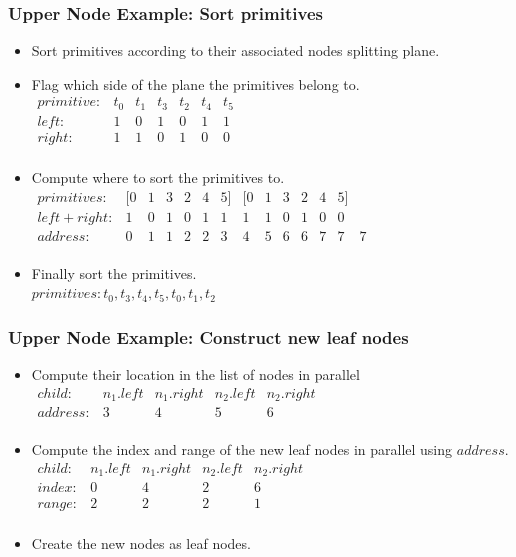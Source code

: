 \documentclass{beamer}
\begin{document}
\begin{frame}
  \frametitle{Upper Node Example: Sort primitives}
  
  \begin{itemize}
  \item Sort primitives according to their associated nodes splitting plane.
  \item Flag which side of the plane the primitives belong to.\\
    $\begin{array}{lcccccc}
      primitive: & t_0 & t_1 & t_3 & t_2 & t_4 & t_5 \\
      left:  & 1 & 0 & 1 & 0 & 1 & 1 \\
      right: & 1 & 1 & 0 & 1 & 0 & 0 \\
    \end{array}$
  \item Compute where to sort the primitives to.\\
    $\begin{array}{lccccccccccccc}
      primitives: & [0 & 1 & 3 & 2 & 4 & 5] & [0 & 1 & 3 & 2 & 4 & 5] \\
      left+right: & 1 & 0 & 1 & 0 & 1 & 1 & 1 & 1 & 0 & 1 & 0 & 0 \\
      address:    & 0 & 1 & 1 & 2 & 2 & 3 & 4 & 5 & 6 & 6 & 7 & 7 & 7 \\
    \end{array}$
  \item Finally sort the primitives.\\
    $primitives: t_0, t_3, t_4, t_5, t_0, t_1, t_2$
  \end{itemize}
\end{frame}

\begin{frame}
  \frametitle{Upper Node Example: Construct new leaf nodes}
  \begin{itemize}
    \item Compute their location in the list of nodes in parallel\\
      $\begin{array}{lcccc}
        child: & n_1.left & n_1.right & n_2.left & n_2.right \\
        address: & 3 & 4 & 5 & 6 \\
      \end{array}$
    \item Compute the index and range of the new leaf nodes in parallel using
      $address$.\\
      $\begin{array}{lcccc}
        child: & n_1.left & n_1.right & n_2.left & n_2.right \\
        index: & 0 & 4 & 2 & 6 \\
        range: & 2 & 2 & 2 & 1 \\
      \end{array}$
    \item Create the new nodes as leaf nodes.\\
  \end{itemize}
\end{frame}
\end{document}
